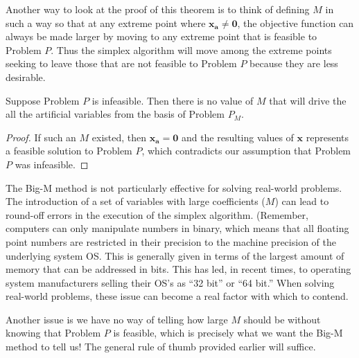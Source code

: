 \begin{remark}
Another way to look at the proof of this theorem is to think of defining $M$ in such a way so that at any extreme point where $\mathbf{x_a} \neq \mathbf{0}$, the objective function can always be made larger by moving to any extreme point that is feasible to Problem $P$. Thus the simplex algorithm will move among the extreme points seeking to leave those that are not feasible to Problem $P$ because they are less desirable.
\end{remark}

\begin{theorem} Suppose Problem $P$ is infeasible. Then there is no value of $M$ that will drive the all the artificial variables from the basis of Problem $P_M$. 
\end{theorem}
\begin{proof} If such an $M$ existed, then $\mathbf{x_a} = \mathbf{0}$ and the resulting values of $\mathbf{x}$ represents a feasible solution to Problem $P$, which contradicts our assumption that Problem $P$ was infeasible.
\end{proof}

\begin{remark} The Big-M method is not particularly effective for solving real-world problems. The introduction of a set of variables with large coefficients ($M$) can lead to round-off errors in the execution of the simplex algorithm. (Remember, computers can only manipulate numbers in binary, which means that all floating point numbers are restricted in their precision to the machine precision of the underlying system OS. This is generally given in terms of the largest amount of memory that can be addressed in bits. This has led, in recent times, to operating system manufacturers selling their OS's as ``32 bit'' or ``64 bit.'' When solving real-world problems, these issue can become a real factor with which to contend.

Another issue is we have no way of telling how large $M$ should be without knowing that Problem $P$ is feasible, which is precisely what we want the Big-M method to tell us! The general rule of thumb provided earlier will suffice. 
\end{remark}

